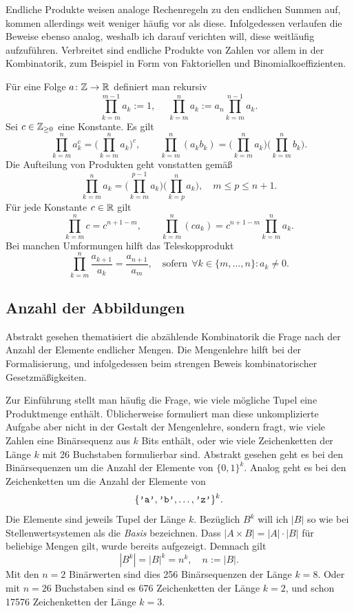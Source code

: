 Endliche Produkte weisen analoge Rechenregeln zu den endlichen Summen
auf, kommen allerdings weit weniger häufig vor als diese. Infolgedessen
verlaufen die Beweise ebenso analog, weshalb ich darauf verichten will,
diese weitläufig aufzuführen. Verbreitet sind endliche Produkte von
Zahlen vor allem in der Kombinatorik, zum Beispiel in Form von Faktoriellen
und Binomialkoeffizienten.

Für eine Folge $a\colon\mathbb Z\to\mathbb R$ definiert man rekursiv
\[\prod_{k=m}^{m-1} a_k := 1,\quad\;
\prod_{k=m}^n a_k := a_n\prod_{k=m}^{n-1} a_k.\]
Sei $c\in\mathbb Z_{\ge 0}$ eine Konstante. Es gilt
\[\prod_{k=m}^n a_k^c = \Big(\prod_{k=m}^n a_k\Big)^c,\qquad
\prod_{k=m}^n (a_k b_k) = \Big(\prod_{k=m}^n a_k\Big)\Big(\prod_{k=m}^n b_k\Big).\]
Die Aufteilung von Produkten geht vonstatten gemäß
\[\prod_{k=m}^n a_k = \Big(\prod_{k=m}^{p-1} a_k\Big)
\Big(\prod_{k=p}^n a_k\Big), \quad m\le p\le n+1.\]
Für jede Konstante $c\in\mathbb R$ gilt
\[\prod_{k=m}^n c = c^{n+1-m},\qquad
\prod_{k=m}^n (ca_k) = c^{n+1-m}\prod_{k=m}^n a_k.\]
Bei manchen Umformungen hilft das Teleskopprodukt
\[\prod_{k=m}^n\frac{a_{k+1}}{a_k} = \frac{a_{n+1}}{a_m},\quad
\text{sofern}\;\,\forall k\in\{m,\ldots,n\}\colon a_k\ne 0.\]

\subsection{Anzahl der Abbildungen}

Abstrakt gesehen thematisiert die abzählende Kombinatorik die Frage
nach der Anzahl der Elemente endlicher Mengen. Die Mengenlehre
hilft bei der Formalisierung, und infolgedessen beim strengen Beweis
kombinatorischer Gesetzmäßigkeiten.

Zur Einführung stellt man häufig die Frage, wie viele mögliche Tupel
eine Produktmenge enthält. Üblicherweise formuliert man diese
unkomplizierte Aufgabe aber nicht in der Gestalt der Mengenlehre,
sondern fragt, wie viele Zahlen eine Binärsequenz aus $k$ Bits enthält,
oder wie viele Zeichenketten der Länge $k$ mit 26 Buchstaben
formulierbar sind. Abstrakt gesehen geht es bei den Binärsequenzen um
die Anzahl der Elemente von $\{0,1\}^k$. Analog geht es bei den
Zeichenketten um die Anzahl der Elemente von
\[\{\verb|'a'|,\verb|'b'|,\ldots,\verb|'z'|\}^k.\]
Die Elemente sind jeweils Tupel der Länge $k$. Bezüglich $B^k$ will
ich $|B|$ so wie bei Stellenwertsystemen als die \emph{Basis}
bezeichnen. Dass $|A\times B| = |A|\cdot |B|$ für beliebige Mengen
gilt, wurde bereits aufgezeigt. Demnach gilt
\[|B^k| = |B|^k = n^k, \quad n:=|B|.\]
Mit den $n=2$ Binärwerten sind dies 256 Binärsequenzen der Länge $k=8$.
Oder mit $n=26$ Buchstaben sind es 676 Zeichenketten der Länge $k=2$,
und schon 17576 Zeichenketten der Länge $k=3$.

